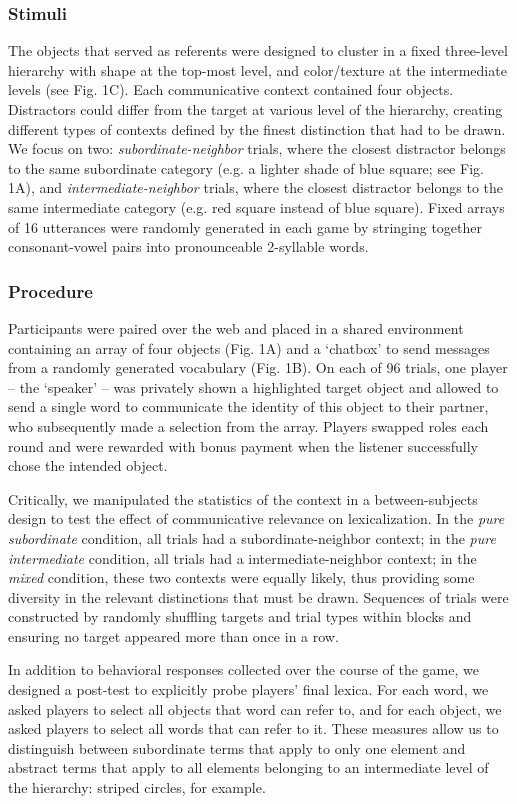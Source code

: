 \documentclass[10pt,letterpaper]{article}
\begin{document}
\subsubsection{Stimuli}
The objects that served as referents were designed to cluster in a fixed three-level hierarchy with shape at the top-most level, and color/texture at the intermediate levels (see Fig. 1C). Each communicative context contained four objects. Distractors could differ from the target at various level of the hierarchy, creating different types of contexts defined by the finest distinction that had to be drawn. We focus on two: \emph{subordinate-neighbor} trials, where the closest distractor belongs to the same subordinate category (e.g. a lighter shade of blue square; see Fig. 1A), and \emph{intermediate-neighbor} trials, where the closest distractor belongs to the same intermediate category (e.g. red square instead of blue square). Fixed arrays of 16 utterances were randomly generated in each game by stringing together consonant-vowel pairs into pronounceable 2-syllable words.

\subsubsection{Procedure}
Participants were paired over the web and placed in a shared environment containing an array of four objects (Fig. 1A) and a `chatbox' to send messages from a randomly generated vocabulary (Fig. 1B). On each of 96 trials, one player -- the `speaker' -- was privately shown a highlighted target object and allowed to send a single word to communicate the identity of this object to their partner, who subsequently made a selection from the array. Players swapped roles each round and were rewarded with bonus payment when the listener successfully chose the intended object.

Critically, we manipulated the statistics of the context in a between-subjects design to test the effect of communicative relevance on lexicalization. In the \emph{pure subordinate} condition, all trials had a subordinate-neighbor context; in the \emph{pure intermediate} condition, all trials had a intermediate-neighbor context; in the \emph{mixed} condition, these two contexts were equally likely, thus providing some diversity in the relevant distinctions that must be drawn. Sequences of trials were constructed by randomly shuffling targets and trial types within blocks and ensuring no target appeared more than once in a row.

In addition to behavioral responses collected over the course of the game, we designed a post-test to explicitly probe players' final lexica. For each word, we asked players to select all objects that word can refer to, and for each object, we asked players to select all words that can refer to it. These measures allow us to distinguish between subordinate terms that apply to only one element and abstract terms that apply to all elements belonging to an intermediate level of the hierarchy: striped circles, for example.
\end{document}
